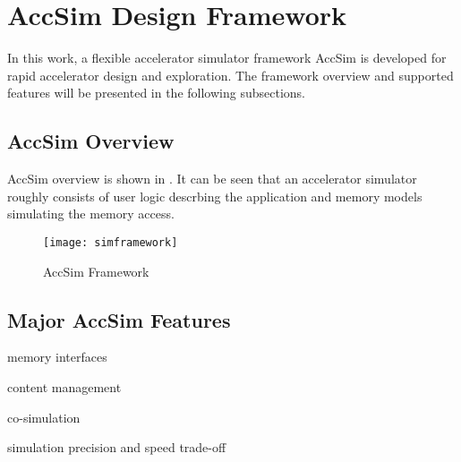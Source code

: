 \section{AccSim Design Framework} \label{sec:customization-framework}
In this work, a flexible accelerator simulator framework AccSim is developed for 
rapid accelerator design and exploration. The framework overview and 
supported features will be presented in the following subsections.

\subsection{AccSim Overview}
AccSim overview is shown in . It can be seen that 
an accelerator simulator roughly consists of user logic descrbing the application 
and memory models simulating the memory access. 

\begin{figure}[htb]
	\centering
	\label{fig:simframework}
	\caption{AccSim Framework}
	\texttt{[image: simframework]}
\end{figure}



\subsection{Major AccSim Features}
memory interfaces

content management

co-simulation

simulation precision and speed trade-off


